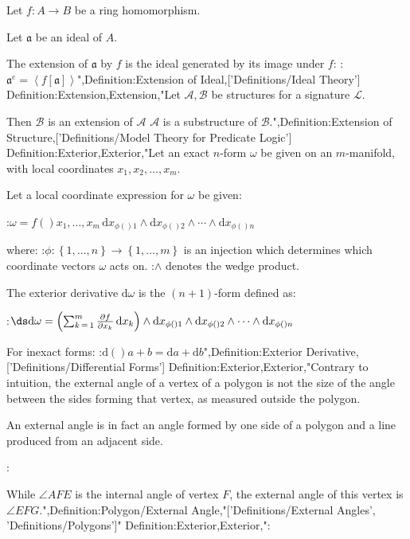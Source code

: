 Let $f : A \to B$ be a ring homomorphism.

Let $\mathfrak a$ be an ideal of $A$.


The extension of $\mathfrak a$ by $f$ is the ideal generated by its image under $f$:
:$\mathfrak a^e = \left\langle f \left[ \mathfrak a \right] \right\rangle$",Definition:Extension of Ideal,['Definitions/Ideal Theory']
Definition:Extension,Extension,"Let $\mathcal A, \mathcal B$ be structures for a signature $\mathcal L$.


Then $\mathcal B$ is an extension of $\mathcal A$  $\mathcal A$ is a substructure of $\mathcal B$.",Definition:Extension of Structure,['Definitions/Model Theory for Predicate Logic']
Definition:Exterior,Exterior,"Let an exact $n$-form $\omega$ be given on an $m$-manifold, with local coordinates $x_1, x_2, \dots, x_m$.

Let a local coordinate expression for $\omega$ be given:

:$\omega = f \left(   \right){x_1, \ldots, x_m} \,\mathrm d x_{\phi \left(   \right)1} \wedge \mathrm d x_{\phi \left(   \right)2} \wedge \cdots \wedge \mathrm d x_{\phi \left(   \right)n}$

where:
:$\phi: \left\lbrace 1, \ldots, n \right\rbrace \to \left\lbrace 1, \ldots, m \right\rbrace$ is an injection which determines which coordinate vectors $\omega$ acts on.
:$\wedge$ denotes the wedge product.


The exterior derivative $\mathrm d \omega$ is the $\left( n + 1 \right)$-form defined as:

:$\ds \mathrm d \omega = \left( \sum_{k \mathop = 1}^m \frac {\partial f} {\partial x_k} \,\mathrm d x_k \right) \wedge \mathrm d x_{\phi \left(   \right)1} \wedge \mathrm d x_{\phi \left(   \right)2} \wedge \dots \wedge \mathrm d x_{\phi \left(   \right)n}$


For inexact forms:
:$\mathrm d \left(   \right){a + b} = \mathrm d a + \mathrm d b$",Definition:Exterior Derivative,['Definitions/Differential Forms']
Definition:Exterior,Exterior,"Contrary to intuition, the external angle of a vertex of a polygon is not the size of the angle between the sides forming that vertex, as measured outside the polygon.

An external angle is in fact an angle formed by one side of a polygon and a line produced from an adjacent side.

:

While $\angle AFE$ is the internal angle of vertex $F$, the external angle of this vertex is $\angle EFG$.",Definition:Polygon/External Angle,"['Definitions/External Angles', 'Definitions/Polygons']"
Definition:Exterior,Exterior,":



